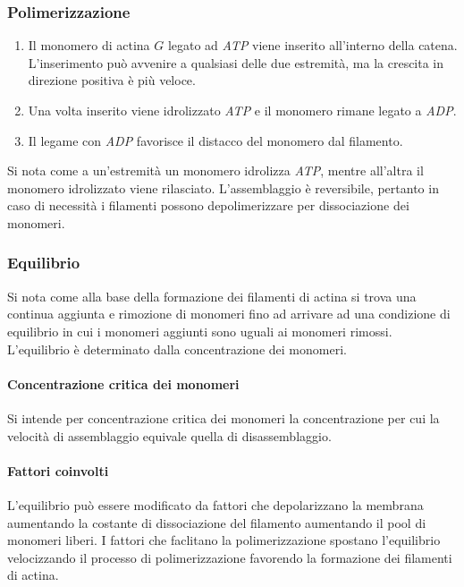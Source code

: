 		\subsubsection{Polimerizzazione}
		\begin{multicols}{2}
			\begin{enumerate}
				\item Il monomero di actina $G$ legato ad \emph{ATP} viene inserito all'interno della catena.
					L'inserimento pu\`o avvenire a qualsiasi delle due estremit\`a, ma la crescita in direzione positiva \`e pi\`u veloce.
				\item Una volta inserito viene idrolizzato \emph{ATP} e il monomero rimane legato a \emph{ADP}.
				\item Il legame con \emph{ADP} favorisce il distacco del monomero dal filamento.
			\end{enumerate}
		\end{multicols}
		Si nota come a un'estremit\`a un monomero idrolizza \emph{ATP}, mentre all'altra il monomero idrolizzato viene rilasciato.
		L'assemblaggio \`e reversibile, pertanto in caso di necessit\`a i filamenti possono depolimerizzare per dissociazione dei monomeri.
		
		\subsubsection{Equilibrio}
		Si nota come alla base della formazione dei filamenti di actina si trova una continua aggiunta e rimozione di monomeri fino ad arrivare ad una condizione di equilibrio in cui i monomeri aggiunti sono uguali ai monomeri rimossi.
		L'equilibrio \`e determinato dalla concentrazione dei monomeri.
			
			\paragraph{Concentrazione critica dei monomeri}
			Si intende per concentrazione critica dei monomeri la concentrazione per cui la velocit\`a di assemblaggio equivale quella di disassemblaggio.

			\paragraph{Fattori coinvolti}
			L'equilibrio pu\`o essere modificato da fattori che depolarizzano la membrana aumentando la costante di dissociazione del filamento aumentando il pool di monomeri liberi.
			I fattori che faclitano la polimerizzazione spostano l'equilibrio velocizzando il processo di polimerizzazione favorendo la formazione dei filamenti di actina.

